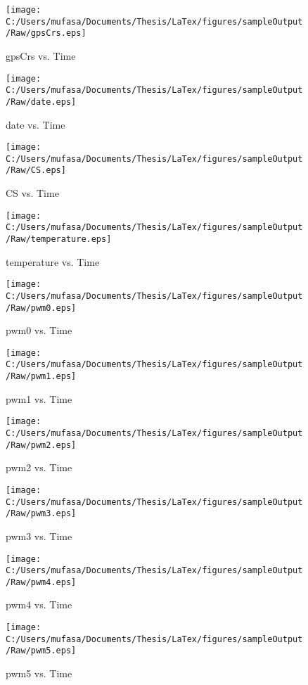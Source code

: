 \begin{figure}[H]
	\centering
	\caption{gpsCrs vs. Time}
		\texttt{[image: C:/Users/mufasa/Documents/Thesis/LaTex/figures/sampleOutput/Raw/gpsCrs.eps]}
\end{figure}
\begin{figure}[H]
	\centering
	\caption{date vs. Time}
		\texttt{[image: C:/Users/mufasa/Documents/Thesis/LaTex/figures/sampleOutput/Raw/date.eps]}
\end{figure}
\begin{figure}[H]
	\centering
	\caption{CS vs. Time}
		\texttt{[image: C:/Users/mufasa/Documents/Thesis/LaTex/figures/sampleOutput/Raw/CS.eps]}
\end{figure}
\begin{figure}[H]
	\centering
	\caption{temperature vs. Time}
		\texttt{[image: C:/Users/mufasa/Documents/Thesis/LaTex/figures/sampleOutput/Raw/temperature.eps]}
\end{figure}
\begin{figure}[H]
	\centering
	\caption{pwm0 vs. Time}
		\texttt{[image: C:/Users/mufasa/Documents/Thesis/LaTex/figures/sampleOutput/Raw/pwm0.eps]}
\end{figure}
\begin{figure}[H]
	\centering
	\caption{pwm1 vs. Time}
		\texttt{[image: C:/Users/mufasa/Documents/Thesis/LaTex/figures/sampleOutput/Raw/pwm1.eps]}
\end{figure}
\begin{figure}[H]
	\centering
	\caption{pwm2 vs. Time}
		\texttt{[image: C:/Users/mufasa/Documents/Thesis/LaTex/figures/sampleOutput/Raw/pwm2.eps]}
\end{figure}
\begin{figure}[H]
	\centering
	\caption{pwm3 vs. Time}
		\texttt{[image: C:/Users/mufasa/Documents/Thesis/LaTex/figures/sampleOutput/Raw/pwm3.eps]}
\end{figure}
\begin{figure}[H]
	\centering
	\caption{pwm4 vs. Time}
		\texttt{[image: C:/Users/mufasa/Documents/Thesis/LaTex/figures/sampleOutput/Raw/pwm4.eps]}
\end{figure}
\begin{figure}[H]
	\centering
	\caption{pwm5 vs. Time}
		\texttt{[image: C:/Users/mufasa/Documents/Thesis/LaTex/figures/sampleOutput/Raw/pwm5.eps]}
\end{figure}
